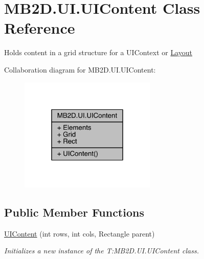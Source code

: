 \hypertarget{class_m_b2_d_1_1_u_i_1_1_u_i_content}{}\section{M\+B2\+D.\+U\+I.\+U\+I\+Content Class Reference}
\label{class_m_b2_d_1_1_u_i_1_1_u_i_content}


Holds content in a grid structure for a U\+I\+Context or \hyperlink{class_m_b2_d_1_1_u_i_1_1_layout}{Layout}  




Collaboration diagram for M\+B2\+D.\+U\+I.\+U\+I\+Content\+:\nopagebreak
\begin{figure}[H]
\begin{center}
\leavevmode
\includegraphics[width=184pt]{class_m_b2_d_1_1_u_i_1_1_u_i_content__coll__graph}
\end{center}
\end{figure}
\subsection*{Public Member Functions}
\begin{DoxyCompactItemize}
\item 
\hyperlink{class_m_b2_d_1_1_u_i_1_1_u_i_content_a80e7f519af0f835fa9912ffa49d76e48}{U\+I\+Content} (int rows, int cols, Rectangle parent)
\begin{DoxyCompactList}\small\item\em Initializes a new instance of the T\+:\+M\+B2\+D.\+U\+I.\+U\+I\+Content class. \end{DoxyCompactList}\end{DoxyCompactItemize}
